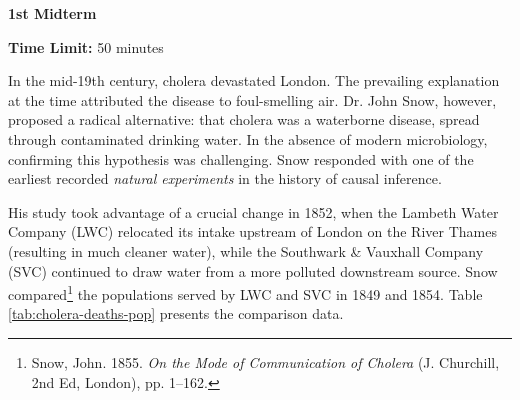 \documentclass[11pt]{exam}
\newcommand{\exam}{1st Midterm}
\begin{document}
\begin{center}

    {\Huge \textbf{\exam{}}}
    \vspace{0.7cm}

    \begin{flushright}
        \textbf{Time Limit:} 50 minutes
    \end{flushright}
    \vspace{-0.2cm}

    
\end{center}

    In the mid-19th century, cholera devastated London. The prevailing explanation at the time attributed the disease to foul-smelling air. Dr. John Snow, however, proposed a radical alternative: that cholera was a waterborne disease, spread through contaminated drinking water. In the absence of modern microbiology, confirming this hypothesis was challenging. Snow responded with one of the earliest recorded \textit{natural experiments} in the history of causal inference.
    
    His study took advantage of a crucial change in 1852, when the Lambeth Water Company (LWC) relocated its intake upstream of London on the River Thames (resulting in much cleaner water), while the Southwark \& Vauxhall Company (SVC) continued to draw water from a more polluted downstream source. Snow compared\footnote{Snow, John. 1855. \textit{On the Mode of Communication of Cholera} (J. Churchill, 2nd Ed, London), pp. 1–162.} the populations served by LWC and SVC in 1849 and 1854. 
    Table \ref{tab:cholera-deaths-pop} presents the comparison data.
    \vspace{-0.5em}
    
\end{document}
